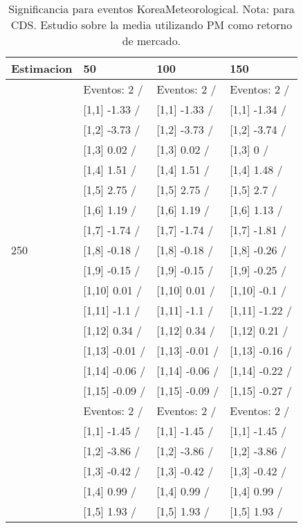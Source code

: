 \begin{table}

\caption{Significancia para eventos KoreaMeteorological. Nota: para CDS. Estudio sobre la media utilizando PM como retorno de mercado.}
\centering
\begin{tabular}[t]{llll}
\toprule
Estimacion & 50 & 100 & 150\\
\midrule
 & Eventos:  2 / & Eventos:  2 / & Eventos:  2 /\\
 & {}[1,1] -1.33  / & {}[1,1] -1.33  / & {}[1,1] -1.34  /\\
 & {}[1,2] -3.73  / & {}[1,2] -3.73  / & {}[1,2] -3.74  /\\
 & {}[1,3] 0.02  / & {}[1,3] 0.02  / & {}[1,3] 0  /\\
 & {}[1,4] 1.51  / & {}[1,4] 1.51  / & {}[1,4] 1.48  /\\
\addlinespace
 & {}[1,5] 2.75  / & {}[1,5] 2.75  / & {}[1,5] 2.7  /\\
 & {}[1,6] 1.19  / & {}[1,6] 1.19  / & {}[1,6] 1.13  /\\
 & {}[1,7] -1.74  / & {}[1,7] -1.74  / & {}[1,7] -1.81  /\\
250 & {}[1,8] -0.18  / & {}[1,8] -0.18  / & {}[1,8] -0.26  /\\
 & {}[1,9] -0.15  / & {}[1,9] -0.15  / & {}[1,9] -0.25  /\\
\addlinespace
 & {}[1,10] 0.01  / & {}[1,10] 0.01  / & {}[1,10] -0.1  /\\
 & {}[1,11] -1.1  / & {}[1,11] -1.1  / & {}[1,11] -1.22  /\\
 & {}[1,12] 0.34  / & {}[1,12] 0.34  / & {}[1,12] 0.21  /\\
 & {}[1,13] -0.01  / & {}[1,13] -0.01  / & {}[1,13] -0.16  /\\
 & {}[1,14] -0.06  / & {}[1,14] -0.06  / & {}[1,14] -0.22  /\\
\addlinespace
 & {}[1,15] -0.09  / & {}[1,15] -0.09  / & {}[1,15] -0.27  /\\
 & Eventos:  2 / & Eventos:  2 / & Eventos:  2 /\\
 & {}[1,1] -1.45  / & {}[1,1] -1.45  / & {}[1,1] -1.45  /\\
 & {}[1,2] -3.86  / & {}[1,2] -3.86  / & {}[1,2] -3.86  /\\
 & {}[1,3] -0.42  / & {}[1,3] -0.42  / & {}[1,3] -0.42  /\\
\addlinespace
 & {}[1,4] 0.99  / & {}[1,4] 0.99  / & {}[1,4] 0.99  /\\
 & {}[1,5] 1.93  / & {}[1,5] 1.93  / & {}[1,5] 1.93  /\\

\end{tabular}
\end{table}
